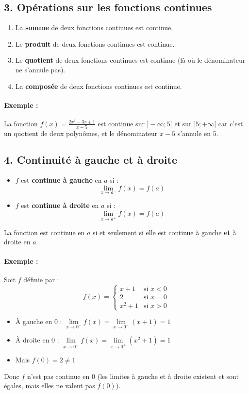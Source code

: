 \documentclass[12pt,a4paper]{article}
\begin{document}
\subsection*{\color{myred}3. Opérations sur les fonctions continues}

\begin{enumerate}
    \item La \textbf{somme} de deux fonctions continues est continue.
    \item Le \textbf{produit} de deux fonctions continues est continue.
    \item Le \textbf{quotient} de deux fonctions continues est continue (là où le dénominateur ne s'annule pas).
    \item La \textbf{composée} de deux fonctions continues est continue.
\end{enumerate}

\paragraph{Exemple :}
La fonction \( f(x) = \frac{2x^2 - 3x + 1}{x - 5} \) est continue sur \( ]-\infty; 5[ \) et sur \( ]5; +\infty[ \) car c'est un quotient de deux polynômes, et le dénominateur \( x - 5 \) s'annule en 5.

\subsection*{\color{myred}4. Continuité à gauche et à droite}

\begin{itemize}
    \item \( f \) est \textbf{continue à gauche} en \( a \) si :
    \[
    \lim_{x \to a^-} f(x) = f(a)
    \]
    \item \( f \) est \textbf{continue à droite} en \( a \) si :
    \[
    \lim_{x \to a^+} f(x) = f(a)
    \]
\end{itemize}

La fonction est continue en \( a \) si et seulement si elle est continue à gauche \textbf{et} à droite en \( a \).

\paragraph{Exemple :}
Soit \( f \) définie par :
\[
f(x) = 
\begin{cases}
x + 1 & \text{si } x < 0 \\
2 & \text{si } x = 0 \\
x^2 + 1 & \text{si } x > 0
\end{cases}
\]
\begin{itemize}
    \item À gauche en 0 : \( \lim\limits_{x \to 0^-} f(x) = \lim\limits_{x \to 0^-} (x+1) = 1 \)
    \item À droite en 0 : \( \lim\limits_{x \to 0^+} f(x) = \lim\limits_{x \to 0^+} (x^2+1) = 1 \)
    \item Mais \( f(0) = 2 \neq 1 \)
\end{itemize}
Donc \( f \) n'est pas continue en 0 (les limites à gauche et à droite existent et sont égales, mais elles ne valent pas \( f(0) \)).
\end{document}
